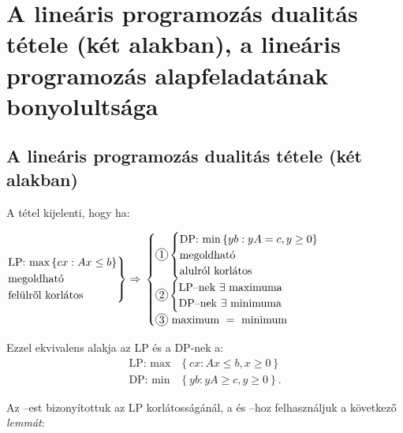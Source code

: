 \skiptooddpage 
\section[A lineáris programozás dualitás tétele]{A lineáris programozás dualitás
tétele (két alakban), a lineáris programozás alapfeladatának bonyolultsága}

\subsection{A lineáris programozás dualitás tétele (két alakban)}
A tétel kijelenti, hogy ha: 

$ \begin{rcases}
\mbox{LP: max}\left\{cx:Ax \leq b\right\} \\
\mbox{megoldható} \\
\mbox{felülről korlátos}
\end{rcases} \Rightarrow$ $\begin{cases}
\circled{1} \begin{cases}
\mbox{DP: min} \left\{ yb:yA = c, y \geq 0 \right\} \\
	\mbox{megoldható} \\ 
	\mbox{alulról korlátos}  
\end{cases} \\
\circled{2} \begin{cases}
\mbox{LP--nek } \exists \mbox{ maximuma} \\
\mbox{DP--nek } \exists \mbox{ minimuma} 
\end{cases}\\
\circled{3} \mbox{ maximum } = \mbox{ minimum}
\end{cases}$

Ezzel ekvivalens alakja az LP és a DP-nek a:
\begin{align*}
\mbox{LP: max} &\left\{ cx:Ax \leq b, x \geq 0 \right\} \\
\mbox{DP: min} &\left\{ yb:yA \geq c, y \geq 0 \right\}.
\end{align*}

Az --est bizonyítottuk az LP korlátosságánál, a  és 
--hoz felhasználjuk a következő \emph{lemmát}:

